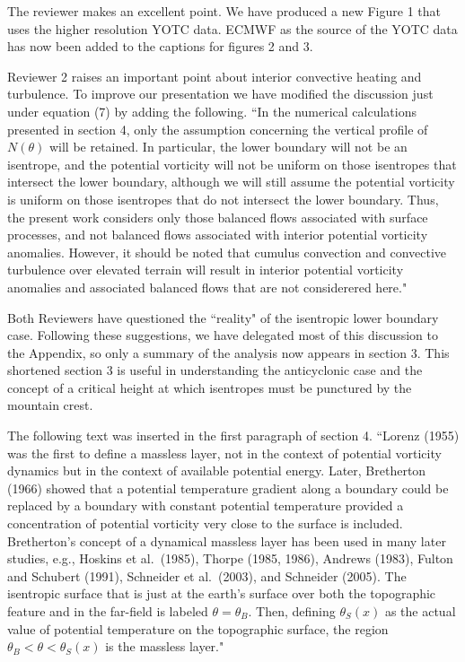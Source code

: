 \documentclass[11pt]{article}
\begin{document}
\medskip
{} The reviewer makes an excellent point. We have produced a new 
Figure 1 that uses the higher resolution YOTC data.  ECMWF as the source of the YOTC data 
has now been added to the captions for figures 2 and 3. 

\medskip
{} Reviewer 2 raises an important point about interior convective 
heating and turbulence. To improve our presentation we have modified the discussion 
just under equation (7) by adding the following. 
 ``In the numerical calculations presented in section 4, only 
the assumption concerning the vertical profile of $N(\theta)$ will be
retained. In particular, the lower boundary will not be an isentrope, and the 
potential vorticity will not be uniform on those isentropes that intersect the
lower boundary, although we will still assume the potential vorticity is uniform 
on those isentropes that do not intersect the lower boundary. Thus, the
present work considers only those balanced flows associated with surface 
processes, and not balanced flows associated with interior potential vorticity anomalies.
However, it should be noted that cumulus convection and convective turbulence 
over elevated terrain will result in interior potential vorticity anomalies
and associated balanced flows that are not considerered here." 

\medskip
{} Both Reviewers have questioned the ``reality" of the isentropic 
lower boundary case. Following these suggestions, we have delegated most of
this discussion to the Appendix, so only a summary of the analysis now appears 
in section 3. This shortened section 3 is useful in understanding the
anticyclonic case and the concept of a critical height at which isentropes 
must be punctured by the mountain crest. 

  The following text was inserted in the first paragraph of section 4.  
``Lorenz (1955) was the first to define a massless 
layer, not in the context of potential vorticity dynamics but in the 
context of available potential energy. Later, Bretherton (1966) showed 
that a potential temperature gradient along a boundary could 
be replaced by a boundary with constant potential temperature provided a 
concentration of potential vorticity very close to the surface is included.  
Bretherton's concept of a dynamical massless layer has been used in 
many later studies, e.g., Hoskins et al.~(1985), Thorpe (1985, 1986), 
Andrews (1983), Fulton and Schubert (1991), Schneider et al.~(2003), 
and Schneider (2005). The isentropic surface that is just at the earth's 
surface over both the topographic feature and in the 
far-field is labeled $\theta=\theta_B$. Then, defining $\theta_S(x)$ as 
the actual value of potential temperature on the topographic surface,  
the region $\theta_B < \theta < \theta_S(x)$ is the massless layer." 
  
\end{document}
